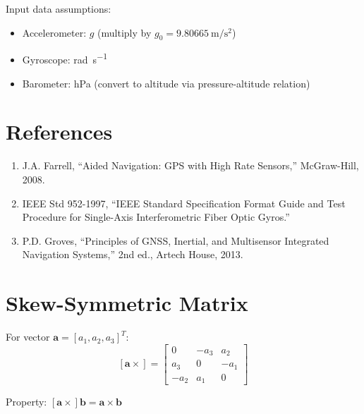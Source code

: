 \documentclass[11pt,a4paper]{article}
\newcommand{\mat}[1]{\mathbf{#1}}
\newcommand{\skewmat}[1]{\left[#1 \times\right]}
\begin{document}
Input data assumptions:
\begin{itemize}
    \item Accelerometer: $g$ (multiply by $g_0 = \SI{9.80665}{\meter\per\second\squared}$)
    \item Gyroscope: \si{\radian\per\second}
    \item Barometer: \si{\hecto\pascal} (convert to altitude via pressure-altitude relation)
\end{itemize}

\section{References}

\begin{enumerate}
    \item J.A. Farrell, ``Aided Navigation: GPS with High Rate Sensors,'' McGraw-Hill, 2008.
    \item IEEE Std 952-1997, ``IEEE Standard Specification Format Guide and Test Procedure for Single-Axis Interferometric Fiber Optic Gyros.''
    \item P.D. Groves, ``Principles of GNSS, Inertial, and Multisensor Integrated Navigation Systems,'' 2nd ed., Artech House, 2013.
\end{enumerate}

\appendix
\section{Skew-Symmetric Matrix}

For vector $\mat{a} = [a_1, a_2, a_3]^T$:
\begin{equation}
    \skewmat{\mat{a}} = \begin{bmatrix}
        0 & -a_3 & a_2 \\
        a_3 & 0 & -a_1 \\
        -a_2 & a_1 & 0
    \end{bmatrix}
\end{equation}

Property: $\skewmat{\mat{a}}\mat{b} = \mat{a} \times \mat{b}$

\end{document}
